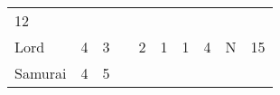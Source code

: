 \documentclass[12pt]{article}
\begin{document}
\begin{longtable}[]{@{}llllllllll@{}}
\begin{minipage}[t]{0.08\columnwidth}\raggedright\strut
12
\strut\end{minipage}\tabularnewline
\begin{minipage}[t]{0.13\columnwidth}\raggedright\strut
Lord
\strut\end{minipage} &
\begin{minipage}[t]{0.06\columnwidth}\raggedright\strut
4
\strut\end{minipage} &
\begin{minipage}[t]{0.06\columnwidth}\raggedright\strut
3
\strut\end{minipage} &
\begin{minipage}[t]{0.06\columnwidth}\raggedright\strut
\strut\end{minipage} &
\begin{minipage}[t]{0.06\columnwidth}\raggedright\strut
2
\strut\end{minipage} &
\begin{minipage}[t]{0.06\columnwidth}\raggedright\strut
1
\strut\end{minipage} &
\begin{minipage}[t]{0.06\columnwidth}\raggedright\strut
1
\strut\end{minipage} &
\begin{minipage}[t]{0.06\columnwidth}\raggedright\strut
4
\strut\end{minipage} &
\begin{minipage}[t]{0.07\columnwidth}\raggedright\strut
N
\strut\end{minipage} &
\begin{minipage}[t]{0.08\columnwidth}\raggedright\strut
15
\strut\end{minipage}\tabularnewline
\begin{minipage}[t]{0.13\columnwidth}\raggedright\strut
Samurai
\strut\end{minipage} &
\begin{minipage}[t]{0.06\columnwidth}\raggedright\strut
4
\strut\end{minipage} &
\begin{minipage}[t]{0.06\columnwidth}\raggedright\strut
5
\strut\end{minipage} &
\begin{minipage}[t]{0.06\columnwidth}\raggedright\strut
\strut\end{minipage} &
\begin{minipage}[t]{0.06\columnwidth}\raggedright\strut
\strut\end{minipage} &

\end{longtable}
\end{document}
